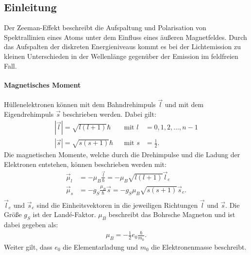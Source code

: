 \subsection{Einleitung}
Der Zeeman-Effekt beschreibt die Aufspaltung und Polarisation von Spektrallinien eines Atoms unter dem Einfluss eines äußeren Magnetfeldes.
Durch das Aufspalten der diskreten Energieniveaus kommt es bei der Lichtemission zu kleinen Unterschieden in der Wellenlänge gegenüber der Emission im feldfreien Fall.

\paragraph{Magnetisches Moment}
Hüllenelektronen können mit dem Bahndrehimpuls $\vec{l}$ und mit dem Eigendrehimpuls $\vec{s}$ beschrieben werden.
Dabei gilt:
\begin{align*}
  |\vec{l}|=\sqrt{l(l+1)}\hbar&& \text{mit } l &= 0,1,2,...,n-1\\
  |\vec{s}|=\sqrt{s(s+1)}\hbar&& \text{mit } s &= \frac{1}{2}.
\end{align*}
Die magnetischen Momente, welche durch die Drehimpulse und die Ladung der Elektronen entstehen, können beschrieben werden mit:
\begin{align}
  \label{eqn:drehimpuls}
  \vec{\mu}_l &= -\mu_B \frac{\vec{l}}{\hbar} = -\mu_B \sqrt{l(l+1)}\vec{l}_e\\
  \label{eqn:spin}
  \vec{\mu}_s &= -g_S \frac{\mu_B}{\hbar}\vec{s} = -g_S \mu_B \sqrt{s(s+1)}\vec{s}_e.\\
\end{align}
$\vec{l}_e$ und $\vec{s}_e$ sind die Einheitsvektoren in die jeweiligen Richtungen $\vec{l}$ und $\vec{s}$.
Die Größe $g_S$ ist der Landé-Faktor. $\mu_B$ beschreibt das Bohrsche Magneton und ist dabei gegeben als:
\begin{align}
  \mu_{B} = -\frac{1}{2} e_0 \frac{\hbar}{m_0}.
  \label{eqn:bohr}
\end{align}
Weiter gilt, dass $e_0$ die Elementarladung und $m_0$ die Elektronenmasse beschreibt.

